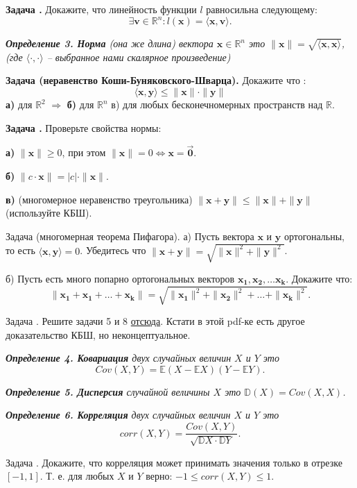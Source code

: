\documentclass[12pt,a4paper]{article}
\def\R{\mathbb{R}}
\def\E{\mathbb{E}}
\def\D{\mathbb{D}}
\newcounter{znum}
\newcommand{\zz}[1]{\addtocounter{znum}{1} \textbf{Задача \arabic{znum}#1. }}
\newcommand{\z}[1]{\addtocounter{znum}{1} Задача \arabic{znum}#1. }
\begin{document}
\zz{} Докажите, что линейность функции $l$ равносильна следующему:
$$ \exists \mathbf{v} \in \R^n : l(\mathbf{x}) = \langle \mathbf{x}, \mathbf{v}\rangle.$$


{\it \textbf{Определение 3. Норма} (она же длина) вектора $\mathbf{x} \in \R^n$ это $ \|\mathbf{x}\| = \sqrt{\langle \mathbf{x}, \mathbf{x} \rangle}$, (где $\langle \cdot , \cdot \rangle$ -- выбранное нами скалярное произведение)}

\zz{ (неравенство Коши-Буняковского-Шварца)} Докажите что :
$$ \langle \mathbf{x}, \mathbf{y} \rangle  \leqslant \|\mathbf{x}\| \cdot \|\mathbf{y}\|$$
\textbf{а)} для $\R^2$ $\Rightarrow$
\textbf{б)} для $\R^n$
в) для любых бесконечномерных пространств над $\R$.

\zz{} Проверьте свойства нормы:\par
\textbf{а)} $\|\mathbf{x}\| \geqslant 0$, при этом $\|\mathbf{x}\| = 0 \Leftrightarrow \mathbf{x} = \overrightarrow{\mathbf{0}}$. \par
\textbf{б)} $\|c \cdot \mathbf{x}\| = |c| \cdot \|\mathbf{x}\|$. \par
\textbf{в)} (многомерное неравенство треугольника) $\|\mathbf{x} + \mathbf{y}\| \leqslant \|\mathbf{x}\| + \|\mathbf{y}\|$ (используйте КБШ).

\z{ (многомерная теорема Пифагора)} а) Пусть вектора $\mathbf{x}$ и $\mathbf{y}$ ортогональны, то есть $\langle \mathbf{x}, \mathbf{y} \rangle = 0$. Убедитесь что $\|\mathbf{x} + \mathbf{y}\| = \sqrt{\|\mathbf{x}\|^2 + \|\mathbf{y}\|^2}$.

б) Пусть есть много попарно ортогональных векторов $\mathbf{x_1}, \mathbf{x_2}, \ldots \mathbf{x_k}$. Докажите что: $$\|\mathbf{x_1} + \mathbf{x_1} + \ldots + \mathbf{x_k}\| = \sqrt{\|\mathbf{x_1}\|^2 + \|\mathbf{x_2}\|^2 + \ldots + \|\mathbf{x_k}\|^2}. $$

\z{} Решите задачи 5 и 8 \href{https://zftsh.online/public/folder\_attachment/a0/a9/a8f7\_061b.pdf?c=006f}{отсюда}. Кстати в этой pdf-ке есть другое доказательство КБШ, но неконцептуальное.

{\it \textbf{Определение 4. Ковариация} двух случайных величин $X$ и $Y$ это
$$Cov(X, Y) = \E (X - \E X)(Y - \E Y).$$
}

{\it \textbf{Определение 5. Дисперсия} случайной величины $X$ это $\D (X) = Cov(X, X)$.}

{\it \textbf{Определение 6. Корреляция} двух случайных величин $X$ и $Y$ это
$$corr(X, Y) = \frac{Cov(X, Y)}{\sqrt{\D X \cdot \D Y}}.$$}

\z{} Докажите, что корреляция может принимать значения только в отрезке $[-1, 1]$. Т. е. для любых $X$ и $Y$ верно: $-1 \leqslant corr(X, Y) \leqslant 1$.
\end{document}
